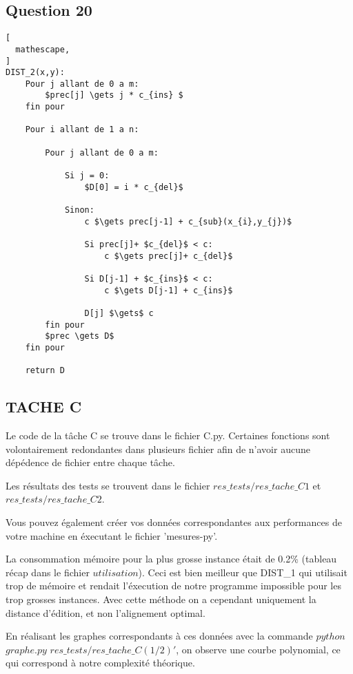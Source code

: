 \documentclass{report}
\begin{document}
\subsection*{Question 20}
\begin{lstlisting}[
  mathescape,
]
DIST_2(x,y):
    Pour j allant de 0 a m:
        $prec[j] \gets j * c_{ins} $
    fin pour
    
    Pour i allant de 1 a n:
    
        Pour j allant de 0 a m:
        
            Si j = 0:
                $D[0] = i * c_{del}$
                
            Sinon:
                c $\gets prec[j-1] + c_{sub}(x_{i},y_{j})$
                    
                Si prec[j]+ $c_{del}$ < c:
                    c $\gets prec[j]+ c_{del}$

                Si D[j-1] + $c_{ins}$ < c:
                    c $\gets D[j-1] + c_{ins}$
                        
                D[j] $\gets$ c
        fin pour
        $prec \gets D$
    fin pour
    
    return D

\end{lstlisting}

\clearpage

\begin{center}

\subsection*{TACHE C}
Le code de la tâche C se trouve dans le fichier C.py. Certaines fonctions sont volontairement redondantes dans plusieurs fichier afin de n'avoir aucune dépédence de fichier entre chaque tâche.

Les résultats des tests se trouvent dans le fichier $res\_tests/res\_tache\_C1$ et $res\_tests/res\_tache\_C2$.

Vous pouvez également créer vos données correspondantes aux performances de votre machine en éxecutant le fichier 'mesures-py'.


La consommation mémoire pour la plus grosse instance était de 0.2\% (tableau récap dans le fichier $utilisation$). Ceci est bien meilleur que DIST\_1 qui utilisait trop de mémoire et rendait l'éxecution de notre programme impossible pour les trop grosses instances. Avec cette méthode on a cependant uniquement la distance d'édition, et non l'alignement optimal.

En réalisant les graphes correspondants à ces données avec la commande  $python$ $graphe.py$ $res\_tests/res\_tache\_C(1/2)' $, on observe une courbe polynomial, ce qui correspond à notre complexité théorique.
\end{center}
\end{document}
